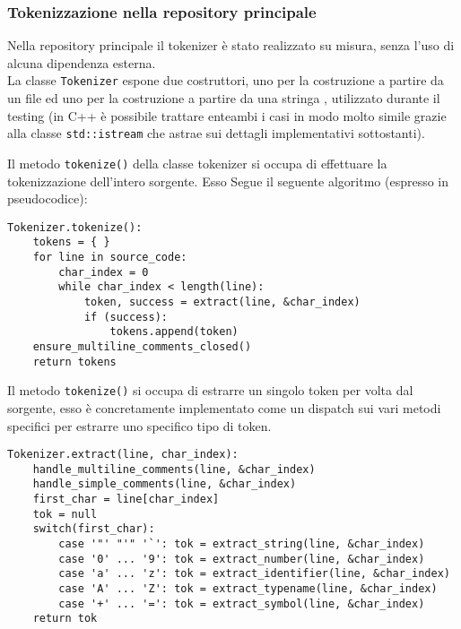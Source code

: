 \subsubsection{Tokenizzazione nella repository principale}
Nella repository principale il tokenizer
è stato realizzato su misura, senza l'uso di alcuna
dipendenza esterna. \\

La classe \texttt{Tokenizer} espone due costruttori, 
uno per la costruzione a partire da un file ed uno 
per la costruzione a partire da una stringa 
, utilizzato durante il testing (in C++ è possibile 
trattare enteambi i casi in modo molto simile grazie
alla classe \texttt{std::istream} che astrae sui 
dettagli implementativi sottostanti).

Il metodo \texttt{tokenize()} della classe tokenizer 
si occupa di effettuare la tokenizzazione dell'intero sorgente. Esso 
Segue il seguente algoritmo (espresso in pseudocodice):

\vspace{0.5cm}
\begin{lstlisting}[frame=single]
Tokenizer.tokenize():
    tokens = { }
    for line in source_code:
        char_index = 0
        while char_index < length(line):
            token, success = extract(line, &char_index)
            if (success): 
                tokens.append(token)
    ensure_multiline_comments_closed()
    return tokens
\end{lstlisting}
\vspace{0.5cm}

Il metodo \texttt{tokenize()} si occupa di estrarre un singolo token 
per volta dal sorgente, esso è concretamente implementato come un dispatch 
sui vari metodi specifici per estrarre uno specifico tipo di token.

\vspace{0.5cm}
\begin{lstlisting}[frame=single]
Tokenizer.extract(line, char_index):
    handle_multiline_comments(line, &char_index)
    handle_simple_comments(line, &char_index)
    first_char = line[char_index]
    tok = null
    switch(first_char):
        case '"' "'" '`': tok = extract_string(line, &char_index)
        case '0' ... '9': tok = extract_number(line, &char_index)
        case 'a' ... 'z': tok = extract_identifier(line, &char_index)
        case 'A' ... 'Z': tok = extract_typename(line, &char_index)
        case '+' ... '=': tok = extract_symbol(line, &char_index)
    return tok
\end{lstlisting}    
\vspace{0.5cm}


